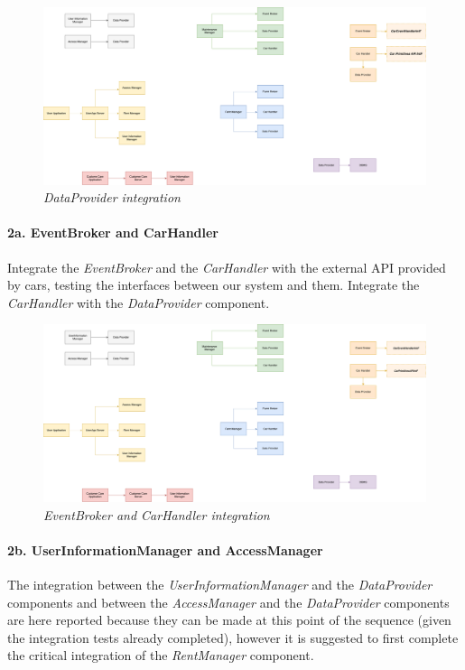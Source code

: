 		\begin{figure}[h]
			\centering
			\includegraphics[width=0.6\linewidth]{img/Integration1}
			\caption{
				\label{fig:dataProvider} 
				\emph{DataProvider integration}
			}
		\end{figure}

\paragraph{2a. EventBroker and CarHandler} 
Integrate the \emph{EventBroker} and the \emph{CarHandler} with the external API provided by cars, testing the interfaces between our system and them. Integrate the \emph{CarHandler} with the \emph{DataProvider} component.\\
		
		\begin{figure}[h]
			\centering
			\includegraphics[width=0.6\linewidth]{img/Integration2a}
			\caption{
				\label{fig:eventBrokerCarHandler} 
				\emph{EventBroker and CarHandler integration}
			}
		\end{figure}

\paragraph{2b. UserInformationManager and AccessManager} 
The integration between the \emph{UserInformationManager} and the \emph{DataProvider} components and between the \emph{AccessManager} and the \emph{DataProvider} components are here reported because they can be made at this point of the sequence (given the integration tests already completed), however it is suggested to first complete the critical integration of the \emph{RentManager} component. \\
